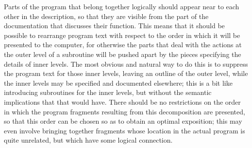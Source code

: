 Parts of the program that belong together logically should appear near to
each other in the description, so that they are visible from the part of the
documentation that discusses their function. This means that it should be
possible to rearrange program text with respect to the order in which it
will be presented to the computer, for otherwise the parts that deal with
the actions at the outer level of a subroutine will be pushed apart by the
pieces specifying the details of inner levels. The most obvious and natural
way to do this is to suppress the program text for those inner levels,
leaving an outline of the outer level, while the inner levels may be
specified and documented elsewhere; this is a bit like introducing
subroutines for the inner levels, but without the semantic implications that
that would have. There should be no restrictions on the order in which the
program fragments resulting from this decomposition are presented, so that
this order can be chosen so as to obtain an optimal exposition; this may
even involve bringing together fragments whose location in the actual
program is quite unrelated, but which have some logical connection.


